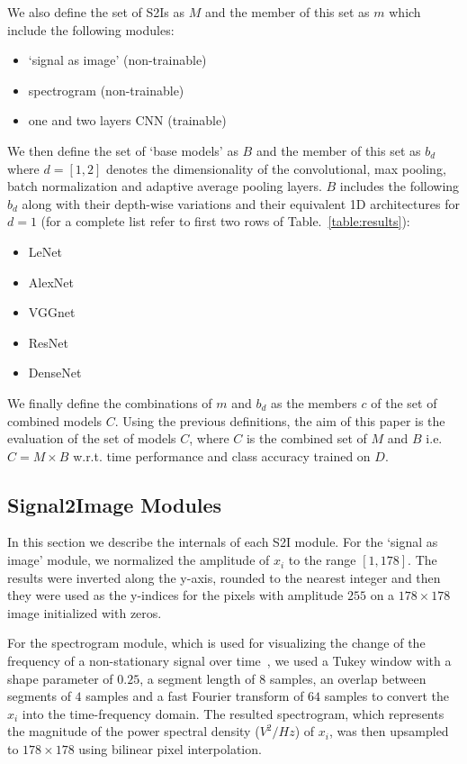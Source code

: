 \documentclass[conference]{IEEEtran}
\begin{document}
We also define the set of S2Is as $M$ and the member of this set as $m$ which include the following modules:
\begin{itemize}
	\item `signal as image' (non-trainable)
	\item spectrogram (non-trainable)
	\item one and two layers CNN (trainable)
\end{itemize}

We then define the set of `base models' as $B$ and the member of this set as $b_d$ where $d=[1,2]$ denotes the dimensionality of the convolutional, max pooling, batch normalization and adaptive average pooling layers.
$B$ includes the following $b_d$ along with their depth-wise variations and their equivalent 1D architectures for $d=1$ (for a complete list refer to first two rows of Table.~\ref{table:results}):
\begin{itemize}
	\item LeNet~\cite{lecun1998gradient}
	\item AlexNet~\cite{krizhevsky2012imagenet}
	\item VGGnet~\cite{simonyan2014very}
	\item ResNet~\cite{he2016deep}
	\item DenseNet~\cite{huang2017densely}
\end{itemize}

We finally define the combinations of $m$ and $b_d$ as the members $c$ of the set of combined models $C$.
Using the previous definitions, the aim of this paper is the evaluation of the set of models $C$, where $C$ is the combined set of $M$ and $B$ i.e. $C=M\times B$ w.r.t. time performance and class accuracy trained on $D$.

\subsection{Signal2Image Modules}
In this section we describe the internals of each S2I module.
For the `signal as image' module, we normalized the amplitude of $x_i$ to the range $[1, 178]$.
The results were inverted along the y-axis, rounded to the nearest integer and then they were used as the y-indices for the pixels with amplitude $255$ on a $178\times 178$ image initialized with zeros.

For the spectrogram module, which is used for visualizing the change of the frequency of a non-stationary signal over time~\cite{oppenheim1999discrete}, we used a Tukey window with a shape parameter of $0.25$, a segment length of $8$ samples, an overlap between segments of $4$ samples and a fast Fourier transform of $64$ samples to convert the $x_i$ into the time-frequency domain.
The resulted spectrogram, which represents the magnitude of the power spectral density ($V^2/Hz$) of $x_i$, was then upsampled to $178\times 178$ using bilinear pixel interpolation.
\end{document}
